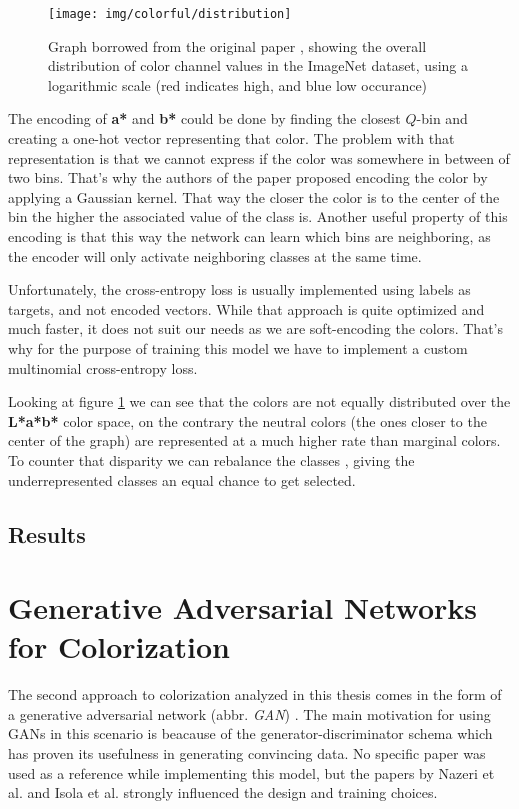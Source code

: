 \begin{figure}[!h]
	\centering
	\texttt{[image: img/colorful/distribution]}
    \caption{Graph borrowed from the original paper \citep{zhang2016colorful}, 
	showing the overall distribution of color channel values in the ImageNet
	dataset, using a logarithmic scale (red indicates high, and blue low occurance)}
	\label{fig:distribution}
\end{figure}

The encoding of \textbf{a*} and \textbf{b*} could be done by finding the 
closest $Q$-bin and creating a one-hot vector representing that color. The 
problem with that representation is that we cannot express if the color
was somewhere in between of two bins. That's why the authors of the 
paper proposed encoding the color by applying a Gaussian kernel. That way
the closer the color is to the center of the bin the higher the associated
value of the class is. Another useful property of this encoding is that this way
the network can learn which bins are neighboring, as the encoder will only 
activate neighboring classes at the same time.

Unfortunately, the cross-entropy loss is usually implemented using labels as targets,
and not encoded vectors. While that approach is quite optimized and much faster, 
it does not suit our needs as we are soft-encoding the colors. That's why for 
the purpose of training this model we have to implement a custom multinomial 
cross-entropy loss.

Looking at figure \ref{fig:distribution} we can see that the colors are not 
equally distributed over the \textbf{L*a*b*} color space, on the contrary
the neutral colors (the ones closer to the center of the graph) are represented
at a much higher rate than marginal colors. To counter that disparity we can
rebalance the classes \citep{tantithamthavorn2020rebalancing}, giving the 
underrepresented classes an equal chance to get selected.

\subsection{Results}

\section{Generative Adversarial Networks for Colorization}
\label{sec:gan}

The second approach to colorization analyzed in this thesis comes in the form
of a generative adversarial network (abbr. \textit{GAN}) \citep{goodfellow2014generative}.
The main motivation for using GANs in this scenario is beacause of the 
generator-discriminator schema which has proven its usefulness in generating 
convincing data. No specific paper was used as a reference while implementing 
this model, but the papers by Nazeri et al. \citep{nazeri2018gan} and Isola 
et al. \citep{isola2017pix2pix} strongly influenced the design and training choices.

